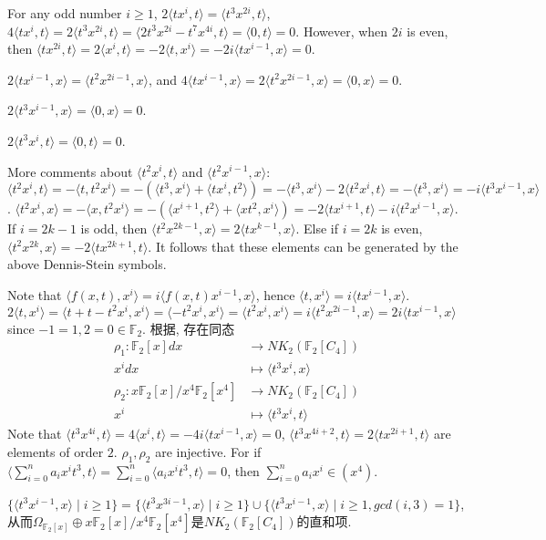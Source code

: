 \begin{remark}
	For any odd number $i\geq 1$, $2\langle tx^{i},t \rangle=\langle t^3x^{2i},t \rangle$, $4\langle tx^{i},t \rangle=2\langle t^3x^{2i},t \rangle=\langle 2t^3x^{2i}-t^7x^{4i},t \rangle=\langle 0,t \rangle=0$. However, when $2i$ is even,  then $\langle tx^{2i},t\rangle =2\langle x^i,t\rangle =-2\langle t,x^i\rangle=-2i\langle tx^{i-1},x\rangle =0$.
	
	$2\langle tx^{i-1},x \rangle=\langle t^2x^{2i-1},x\rangle$, and $4\langle tx^{i-1},x \rangle=2\langle t^2x^{2i-1},x\rangle= \langle 0, x \rangle =0$.

	

	$2\langle t^3x^{i-1},x \rangle=\langle 0,x \rangle=0$.

	$2\langle t^3x^{i},t \rangle=\langle 0,t \rangle=0$.
	

	More comments about $\langle t^2x^i,t\rangle$ and $\langle t^2x^{i-1},x\rangle$:  $\langle t^2x^i,t\rangle=-\langle t,t^2x^i\rangle=-(\langle t^3,x^i\rangle+\langle tx^i,t^2\rangle)=-\langle t^3,x^i\rangle-2\langle t^2x^i,t\rangle=-\langle t^3,x^i\rangle=-i\langle t^3x^{i-1},x\rangle$. $\langle t^2x^i,x\rangle=-\langle x,t^2x^i\rangle=-(\langle x^{i+1},t^2\rangle+\langle xt^2,x^i\rangle)=-2\langle tx^{i+1},t\rangle-i\langle t^2x^{i-1},x\rangle$. If $i =2k-1$ is odd, then $\langle t^2x^{2k-1},x\rangle=2\langle tx^{k-1},x \rangle$. Else if $i=2k$ is even, $\langle t^2x^{2k},x\rangle=-2\langle tx^{2k+1},t\rangle$. It follows that these elements can be generated by the above Dennis-Stein symbols.


	Note that $\langle f(x,t),x^i \rangle=i\langle f(x,t)x^{i-1},x\rangle$, hence $\langle t,x^i \rangle=i\langle tx^{i-1},x\rangle$. 
	$2 \langle t,x^i \rangle = \langle t+t-t^2x^i,x^i \rangle =\langle -t^2x^i,x^i \rangle =\langle t^2x^i,x^i \rangle =i\langle t^2x^{2i-1},x \rangle=2i\langle tx^{i-1},x \rangle $ since $-1=1, 2=0 \in \mathbb{F}_2$.
	根据\cite{MR80k:13005}, 存在同态
	\begin{align*}
	\rho_1 \colon \mathbb{F}_2[x]dx &\longrightarrow NK_2(\mathbb{F}_2[C_4])\\
				x^idx &\mapsto \langle t^3x^i,x\rangle \\
	\rho_2 \colon x\mathbb{F}_2[x]/x^4\mathbb{F}_2[x^4] &\longrightarrow NK_2(\mathbb{F}_2[C_4])\\
				x^i &\mapsto \langle t^3x^i,t\rangle 
	\end{align*}
	Note that $\langle t^3x^{4i},t\rangle = 4\langle x^i,t\rangle =-4i\langle tx^{i-1},x\rangle=0$, $\langle t^3x^{4i+2},t\rangle = 2\langle tx^{2i+1},t\rangle$ are elements of order $2$. $\rho_1,\rho_2$ are injective. For if $\langle\sum_{i=0}^n a_ix^it^3,t\rangle=\sum_{i=0}^n\langle a_ix^it^3,t\rangle=0$, then $\sum_{i=0}^n a_ix^i\in (x^4)$.
	
	$\{\langle t^3x^{i-1},x \rangle \mid i\geq 1\}=\{\langle t^3x^{3i-1},x \rangle \mid i\geq 1\}\cup\{\langle t^3x^{i-1},x \rangle \mid i\geq 1,gcd(i,3)=1\}$, 从而$\Omega_{\mathbb{F}_2[x]}\oplus x\mathbb{F}_2[x]/x^4\mathbb{F}_2[x^4]$是$NK_2(\mathbb{F}_2[C_4])$的直和项. 
\end{remark}

